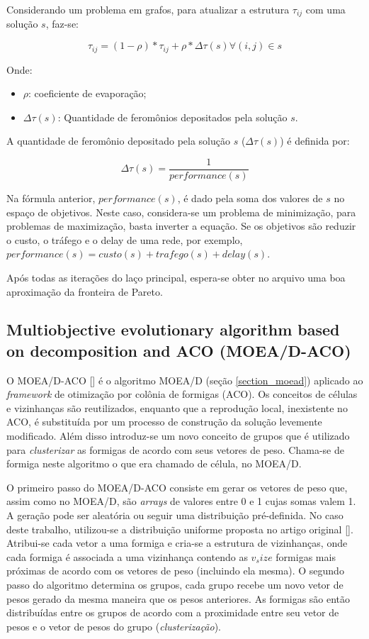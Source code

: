 Considerando um problema em grafos, para atualizar a estrutura $\tau_{ij}$ com uma solução $s$, faz-se:

\[\tau_{ij} = (1 - \rho) * \tau_{ij} + \rho * \Delta\tau(s) \forall(i,j) \in s\]

Onde:
\begin{itemize} 
	\item $\rho$: coeficiente de evaporação;
	\item $\Delta\tau(s)$: Quantidade de feromônios depositados pela solução $s$.
\end{itemize}

A quantidade de feromônio depositado pela solução $s$ ($\Delta\tau(s)$) é definida por:

\[\Delta\tau(s) = \frac{1}{performance(s)}\]

Na fórmula anterior, $performance(s)$, é dado pela soma dos valores de $s$ no espaço de objetivos. Neste caso, considera-se um problema de minimização, para problemas de maximização, basta inverter a equação. Se os objetivos são reduzir o custo, o tráfego e o delay de uma rede, por exemplo, $performance(s) = custo(s) + trafego(s) + delay(s)$.

Após todas as iterações do laço principal, espera-se obter no arquivo uma boa aproximação da fronteira de Pareto. 

\subsection{Multiobjective evolutionary algorithm based on decomposition and ACO (MOEA/D-ACO)}
O MOEA/D-ACO [] é o algoritmo MOEA/D (seção \ref{section_moead}) aplicado ao \textit{framework} de otimização por colônia de formigas (ACO). Os conceitos de células e vizinhanças são reutilizados, enquanto que a reprodução local, inexistente no ACO, é substituída por um processo de construção da solução levemente modificado. Além disso introduz-se um novo conceito de grupos que é utilizado para \textit{clusterizar} as formigas de acordo com seus vetores de peso. Chama-se de formiga neste algoritmo o que era chamado de célula, no MOEA/D.

O primeiro passo do MOEA/D-ACO consiste em gerar os vetores de peso que, assim como no MOEA/D, são \textit{arrays} de valores entre 0 e 1 cujas somas valem 1. A geração pode ser aleatória ou seguir uma distribuição pré-definida. No caso deste trabalho, utilizou-se a distribuição uniforme proposta no artigo original []. Atribui-se cada vetor a uma formiga e cria-se a estrutura de vizinhanças, onde cada formiga é associada a uma vizinhança contendo as $v_size$ formigas mais próximas de acordo com os vetores de peso (incluindo ela mesma). O segundo passo do algoritmo determina os grupos, cada grupo recebe um novo vetor de pesos gerado da mesma maneira que os pesos anteriores. As formigas são então distribuídas entre os grupos de acordo com a proximidade entre seu vetor de pesos e o vetor de pesos do grupo (\textit{clusterização}).

